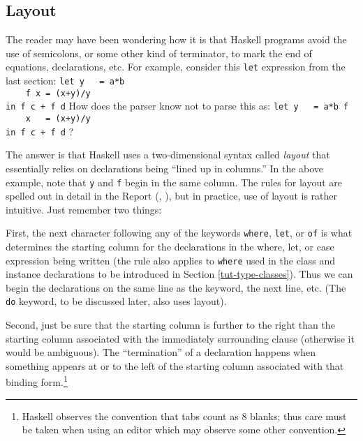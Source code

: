 \subsection{Layout}
\label{tut-layout}

The reader may have been wondering how it is that Haskell programs
avoid the use of semicolons, or some other kind of terminator, to
mark the end of equations, declarations, etc.  For example, consider
this \mbox{\tt let} expression from the last section:
\bprog
\mbox{\tt let\ y\ \ \ =\ a*b}\\
\mbox{\tt \ \ \ \ f\ x\ =\ (x+y)/y}\\
\mbox{\tt in\ f\ c\ +\ f\ d}
\eprog
How does the parser know not to parse this as:
\bprog
\mbox{\tt let\ y\ \ \ =\ a*b\ f}\\
\mbox{\tt \ \ \ \ x\ \ \ =\ (x+y)/y}\\
\mbox{\tt in\ f\ c\ +\ f\ d}
\eprog
?

The answer is that Haskell uses a two-dimensional syntax called {\em
layout} that essentially relies on declarations being ``lined up in
columns.''  In the above example, note that \mbox{\tt y} and \mbox{\tt f} begin in the
same column.  The rules for layout are spelled out in detail in the
Report (, ), but in practice, use of
layout is rather intuitive.  Just remember two things:

First, the next character following any of the keywords \mbox{\tt where},
\mbox{\tt let}, or \mbox{\tt of} is what determines the starting column for the
declarations in the where, let, or case expression being written (the
rule also applies to \mbox{\tt where} used in the class and instance
declarations to be introduced in Section \ref{tut-type-classes}).  Thus
we can begin the declarations on the same line as the keyword, the
next line, etc.  (The \mbox{\tt do} keyword, to be discussed later, also uses layout).

Second, just be sure that the starting column is further to the right
than the starting column associated with the immediately surrounding
clause (otherwise it would be ambiguous).  The ``termination'' of a
declaration happens when something appears at or to the left of the
starting column associated with that binding form.\footnote{Haskell
observes the convention that tabs count as 8 blanks; thus care must be
taken when using an editor which may observe some other convention.}

